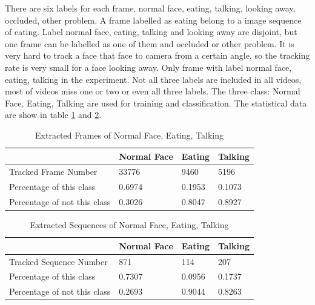 \newline
There are six labels for each frame, normal face, eating, talking, looking away, occluded, other problem. A frame labelled as eating belong to a image sequence of eating. Label normal face, eating, talking and looking away are disjoint, but one frame can be labelled as one of them and occluded or other problem. It is very hard to track a face that face to camera from a certain angle, so the tracking rate is very small for a face looking away. Only frame with label normal face, eating, talking in the experiment. Not all three labels are included in all videos, most of videos miss one or two or even all three labels.
\newline
The three class: Normal Face, Eating, Talking are used for training and classification. The statistical data are show in table \ref{tab:UFD} and \ref{tab:USD}.
\begin{table}[ht]
\centering
\begin{tabular}{l|l|l|l|}
\cline{2-4}
                                                   & Normal Face & Eating & Talking \\ \hline
\multicolumn{1}{|l|}{Tracked Frame Number}         & 33776       & 9460   & 5196    \\ \hline
\multicolumn{1}{|l|}{Percentage of this class}     & 0.6974      & 0.1953 & 0.1073  \\ \hline
\multicolumn{1}{|l|}{Percentage of not this class} & 0.3026      & 0.8047 & 0.8927  \\ \hline
\end{tabular}
\caption{Extracted Frames of Normal Face, Eating, Talking}
\label{tab:UFD}
\end{table}
\begin{table}[ht]
\centering
\begin{tabular}{l|l|l|l|}
\cline{2-4}
                                                   & Normal Face & Eating & Talking \\ \hline
\multicolumn{1}{|l|}{Tracked Sequence Number}      & 871         & 114    & 207     \\ \hline
\multicolumn{1}{|l|}{Percentage of this class}     & 0.7307      & 0.0956 & 0.1737  \\ \hline
\multicolumn{1}{|l|}{Percentage of not this class} & 0.2693      & 0.9044 & 0.8263  \\ \hline
\end{tabular}
\caption{Extracted Sequences of Normal Face, Eating, Talking}
\label{tab:USD}
\end{table}
